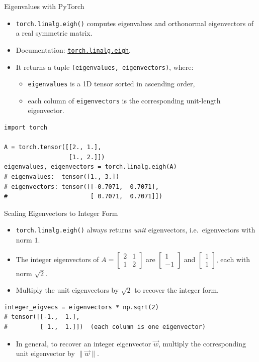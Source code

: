 \documentclass{beamer}
\begin{document}
\begin{frame}[fragile]{Eigenvalues with PyTorch}
  \begin{itemize}
    \item \texttt{torch.linalg.eigh()} computes eigenvalues and orthonormal eigenvectors of a real symmetric matrix.
    \item Documentation: \href{https://pytorch.org/docs/stable/generated/torch.linalg.eigh.html}{\texttt{torch.linalg.eigh}}.
    \item It returns a tuple \texttt{(eigenvalues, eigenvectors)}, where:
    \begin{itemize}
      \item \texttt{eigenvalues} is a 1D tensor sorted in ascending order,
      \item each column of \texttt{eigenvectors} is the corresponding unit-length eigenvector.
    \end{itemize}
  \end{itemize}
  \begin{lstlisting}
import torch

A = torch.tensor([[2., 1.],
                  [1., 2.]])
eigenvalues, eigenvectors = torch.linalg.eigh(A)
# eigenvalues:  tensor([1., 3.])
# eigenvectors: tensor([[-0.7071,  0.7071],
#                       [ 0.7071,  0.7071]])
  \end{lstlisting}
\end{frame}

\begin{frame}[fragile]{Scaling Eigenvectors to Integer Form}
  \begin{itemize}
    \item \texttt{torch.linalg.eigh()} always returns \emph{unit} eigenvectors, i.e.\ eigenvectors with norm \(1\).
    \item The integer eigenvectors of \(A = \begin{bmatrix}2 & 1 \\ 1 & 2\end{bmatrix}\) are \(\begin{bmatrix}1 \\ -1\end{bmatrix}\) and \(\begin{bmatrix}1 \\ 1\end{bmatrix}\), each with norm \(\sqrt{2}\).
    \item Multiply the unit eigenvectors by \(\sqrt{2}\) to recover the integer form.
  \end{itemize}
  \begin{lstlisting}
integer_eigvecs = eigenvectors * np.sqrt(2)
# tensor([[-1.,  1.],
#         [ 1.,  1.]])  (each column is one eigenvector)
  \end{lstlisting}
  \begin{itemize}
    \item In general, to recover an integer eigenvector \(\vec{w}\), multiply the corresponding unit eigenvector by \(\|\vec{w}\|\).
  \end{itemize}
\end{frame}
\end{document}
